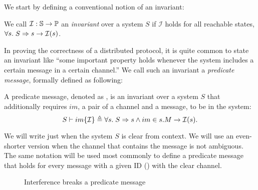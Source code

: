 We start by defining a conventional notion of an invariant:
\begin{definition}[Invariants]
  We call $\mathcal{I}: \mathbb{S}{} \to \mathbb{P}{}$ an \emph{invariant} over a system $S$ if $\mathcal{I}$ holds for all reachable states, \ie{} $\forall s.\; S \Rightarrow s \to \mathcal{I}(s)$.
\end{definition}

In proving the correctness of a distributed protocol, it is quite common to state an invariant like ``some important property holds whenever the system includes a certain message in a certain channel.''
We call such an invariant a \emph{predicate message}, formally defined as following:
\begin{definition}
  A predicate message, denoted as , is an invariant over a system $S$ that additionally requires $im$, a pair of a channel and a message, to be in the system:
  \begin{displaymath}
    S \vdash im\{\mathcal{I}\} \triangleq \forall s.\; S \Rightarrow s \wedge im \in s.M \to \mathcal{I}(s).
  \end{displaymath}
  \label{def-pred-msg}
\end{definition}

We will write just  when the system $S$ is clear from context.
We will use an even-shorter version  when the channel that contains the message is not ambiguous.
The same notation  will be used most commonly to define a predicate message that holds for every message with a given ID (\msgid{}) with the clear channel.

\begin{figure}[h]
  \centering
  \caption{Interference breaks a predicate message}
  \label{fig-ex-pred-msg-fail}
\end{figure}

